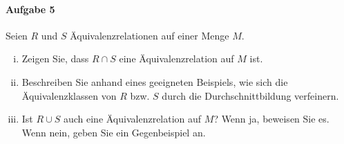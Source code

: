 \documentclass{scrreprt}
\begin{document}
\paragraph{Aufgabe 5} Seien $R$ und $S$ Äquivalenzrelationen auf einer Menge $M$.
\begin{enumerate}[(i)]
\item Zeigen Sie, dass $R \cap S$ eine Äquivalenzrelation auf $M$ ist.
\item Beschreiben Sie anhand eines geeigneten Beispiels, wie sich die
  Äquivalenzklassen von $R$ bzw. $S$ durch die Durchschnittbildung verfeinern.
\item Ist $R \cup S$ auch eine Äquivalenzrelation auf $M$?
  Wenn ja, beweisen Sie es.
  Wenn nein, geben Sie ein Gegenbeispiel an.
\end{enumerate}
\end{document}
